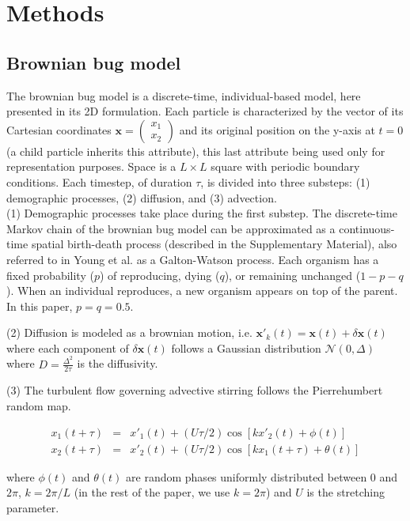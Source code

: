 \section*{Methods}

\subsection*{Brownian bug model}
The brownian bug model is a discrete-time, individual-based model, here presented in its 2D formulation. Each particle is characterized by the vector of its Cartesian coordinates $\boldsymbol{x}=\begin{pmatrix} 
      x_1\\ 
      x_2 
\end{pmatrix}$ and its original position on the y-axis at $t=0$ (a child particle inherits this attribute), this last attribute being used only for representation purposes. Space is a $L\times L$ square with periodic boundary conditions. Each timestep, of duration $\tau$, is divided into three substeps: (1) demographic processes, (2) diffusion, and (3) advection. \\

(1) Demographic processes take place during the first substep. The discrete-time Markov chain of the brownian bug model can be approximated as a continuous-time spatial birth-death process (described in the Supplementary Material), also referred to in Young et al. \cite{young_reproductive_2001} as a Galton-Watson process. Each organism has a fixed probability ($p$) of reproducing, dying ($q$), or remaining unchanged ($1-p-q$). When an individual reproduces, a new organism appears on top of the parent. In this paper, $p=q=0.5$.

(2) Diffusion is modeled as a brownian motion, i.e. $\boldsymbol{x'}_k(t)=\boldsymbol{x}(t)+\delta\boldsymbol{x}(t)$ where each component of $\delta\boldsymbol{x}(t)$ follows a Gaussian distribution $\mathcal{N}(0,\Delta)$ where $D=\frac{\Delta^2}{2\tau}$ is the diffusivity. 

(3) The turbulent flow governing advective stirring follows the Pierrehumbert random map.

\begin{eqnarray}
 x_1(t+\tau)&=&x'_1(t)+(U\tau/2)\cos[kx'_2(t)+\phi(t)]\\
 x_2(t+\tau)&=&x'_2(t)+(U\tau/2)\cos[kx_1(t+\tau)+\theta(t)]
 \label{eq:pierrehumbert}
 \end{eqnarray}

 where $\phi(t)$ and $\theta(t)$ are random phases uniformly distributed between 0 and $2\pi$, $k=2\pi/L$ (in the rest of the paper, we use $k=2\pi$) and $U$ is the stretching parameter. \\
 
